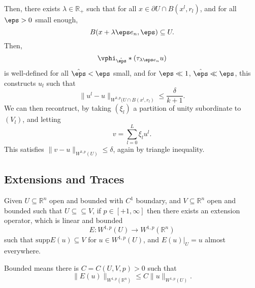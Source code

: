 \documentclass[12pt]{article}
\begin{document}
\begin{proofbox}
	Then, there exists $\lambda \in \mathbb{R}_+$ such that for all $x \in \partial U \cap B(x^l, r_l)$, and for all $\eps  >0$ small enough,
	\[
		B(x + \lambda \eps e_n, \eps) \subseteq U.
	\]
	Then,
	\[
	\vphi_{\hat \eps} \ast (\tau_{\lambda \eps e_n} u)
	\]
	is well-defined for all $\hat \eps < \eps$ small, and for $\eps \ll 1$, $\hat \eps \ll \eps$, this constructs $u_l$ such that
	\[
	\|u^l - u\|_{W^{k, p}(U \cap B(x^l, r_l)} \leq \frac{\delta}{k+1}.
	\]
	We can then recontruct, by taking $(\xi_l)$ a partition of unity subordinate to $(V_l)$, and letting
	\[
	v = \sum_{l = 0}^L \xi_l u^l.
	\]
	This satisfies $\|v - u\|_{W^{k, p}(U)} \leq \delta$, again by triangle inequality.
\end{proofbox}


\subsection{Extensions and Traces}%
\label{sub:ext_tr}

\begin{theorem}
	Given $U \subseteq \mathbb{R}^n$ open and bounded with $C^1$ boundary, and $V \subseteq \mathbb{R}^{n}$ open and bounded such that $U \subseteq \subseteq V$, if $p \in [+1, \infty]$ then there exists an extension operator, which is linear and bounded
	\[
	E : W^{1, p}(U) \to W^{1, p}(\mathbb{R}^n)
	\]
	 such that $\mathrm{supp} E(u) \subseteq V$ for $u \in W^{1, p}(U)$, and $E(u)|_{U} = u$ almost everywhere.
\end{theorem}

\begin{remark}
	Bounded means there is $C = C(U, V, p) > 0$ such that
	\[
	\|E(u)\|_{W^{1, p}(\mathbb{R}^n)} \leq C \|u\|_{W^{1, p}(U)}.
	\]
\end{remark}
\end{document}
